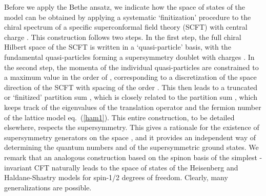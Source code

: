 \documentclass[a4paper,prl,aps,twocolumn]{revtex4}
\begin{document}
Before we apply the Bethe ansatz,  
we indicate how the space of states \coordHE{} of the model can be  
obtained by applying a systematic `finitization' procedure  
\cite{kjs-bs} to the chiral spectrum of a specific \coordHE{}   
superconformal field theory (SCFT) with central charge \coordHE{}.   
This construction follows two steps. In the first step,  
the full chiral Hilbert space of the SCFT is written in a   
`quasi-particle' basis, with the fundamental quasi-particles 
forming a supersymmetry doublet with charges \coordHE{}. 
In the second step, the momenta of the individual quasi-particles 
are constrained to  
a maximum value in the order of \coordHE{}, corresponding to a discretization  
of the space direction of the SCFT with spacing of the order \coordHE{}.   
This then leads to a truncated or `finitized' partition sum \coordHE{},  
which is closely related to the partition sum   
\coordHE{},   
which keeps track of the eigenvalues of the translation operator \coordHE{}   
and the fermion number \coordHE{} of the lattice model eq.~(\ref{ham1}).  
This entire construction, to be detailed elsewhere, respects  
the supersymmetry. This gives a rationale for the existence   
of supersymmetry generators on the space \coordHE{}, and it  
provides an independent way of determining the quantum numbers   
\coordHE{} and \coordHE{} of the supersymmetric ground states. We   
remark that an analogous construction based on the spinon basis of   
the simplest \coordHE{}-invariant CFT naturally leads to the space of   
states of the Heisenberg and Haldane-Shastry models for \coordHE{} spin-1/2   
degrees of freedom. Clearly, many generalizations are possible.  
  
\end{document}
